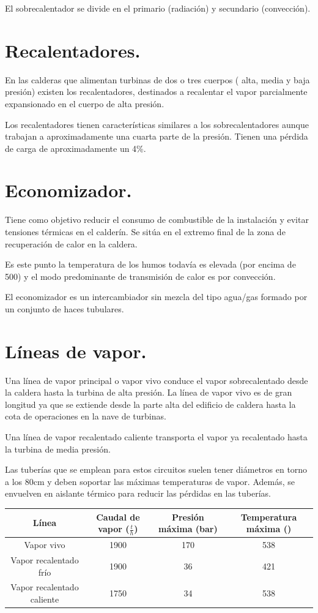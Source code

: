 El sobrecalentador se divide en el primario (radiación) y secundario (convección).


\section{Recalentadores.}
En las calderas que alimentan turbinas de dos o tres cuerpos ( alta, media y baja presión)
existen los recalentadores, destinados a recalentar el vapor parcialmente expansionado en el
cuerpo de alta presión.


Los recalentadores tienen características similares a los sobrecalentadores aunque trabajan a aproximadamente una cuarta parte de la presión. Tienen una pérdida de carga de aproximadamente un 4\%.

\section{Economizador.}
Tiene como objetivo reducir el consumo de combustible de la instalación y evitar tensiones térmicas en el calderín. Se sitúa en el extremo final de la zona de recuperación de calor en la caldera.


Es este punto la temperatura de los humos todavía es elevada (por encima de 500\grado) y el
modo predominante de transmisión de calor es por convección.

El economizador es un intercambiador sin mezcla del tipo agua/gas formado por un conjunto de
haces tubulares.

\section{Líneas de vapor.}
Una línea de vapor principal o vapor vivo conduce el vapor sobrecalentado desde la caldera hasta la turbina
de alta presión. La línea de vapor vivo es de gran longitud ya que se extiende desde la parte alta del
edificio de caldera hasta la cota de operaciones en la nave de turbinas.



Una línea de vapor recalentado caliente transporta el vapor ya recalentado hasta la turbina de media presión.



Las tuberías que se emplean para estos circuitos suelen tener diámetros en torno a los 80cm y deben soportar las máximas temperaturas de vapor. Además, se envuelven en aislante térmico para reducir las pérdidas en las tuberías.

\begin{table}[H]
	\centering
	\renewcommand{\arraystretch}{1.5}
	\begin{tabular}{cccc}
		\hline
		Línea&Caudal de vapor ($\frac{t}{h}$)&Presión máxima (bar)&Temperatura máxima (\grado)\\
		\hline
		Vapor vivo&1900&170&538\\
		\hline
		Vapor recalentado frío&1900&36&421\\
		\hline
		Vapor recalentado caliente&1750&34&538\\
		\hline
	\end{tabular}
\end{table}
